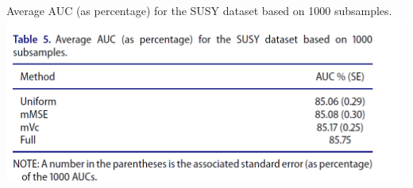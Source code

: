 \documentclass[12pt]{beamer}
\begin{document}
\begin{frame}{Average AUC (as percentage) for the SUSY dataset based on 1000 subsamples.}
\includegraphics[scale=1]{fig17.png} 
\end{frame}
\end{document}
